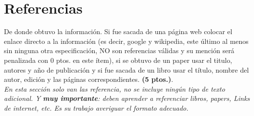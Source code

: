 \documentclass[journal, 10pt]{IEEEtran}
\begin{document}
\section{Referencias}

De donde obtuvo la información. Si fue sacada de una página web colocar el enlace directo a la información (es decir, google y wikipedia, este último al menos sin ninguna otra especificación, NO son referencias válidas y su mención será penalizada con 0 ptos. en este ítem), si se obtuvo de un paper usar el titulo, autores y año de publicación y si fue sacada de un libro usar el título, nombre del autor, edición y las páginas correspondientes. \textbf{(5 ptos.)}.\\

\textit{En esta sección solo van las referencia, no se incluye ningún tipo de texto adicional. Y \textbf{muy importante}: deben aprender a referenciar libros, papers, Links de internet, etc. Es su trabajo averiguar el formato adecuado.}




\end{document}
